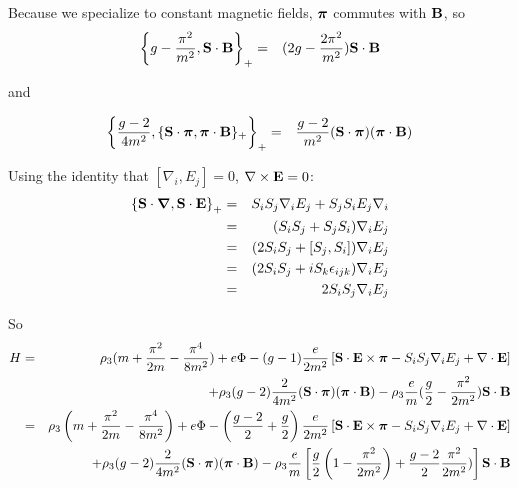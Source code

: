 Because we specialize to constant magnetic fields, $\mbox{\boldmath$ \pi $}$ commutes with $\mathbf{B}$, so 
\begin{eqnarray*}
\left \{ g -\frac{\pi^2}{m^2} , \mathbf{S} \cdot \mathbf{B} \right \}_+
	&=&	(2g - \frac{2\pi^2}{m^2}) \mathbf{S} \cdot \mathbf{B}
\end{eqnarray*}

and

\begin{eqnarray*}
\left \{ \frac{g-2}{4m^2}, 
			\{\mathbf{S} \cdot \mbox{\boldmath$ \pi $}, \mbox{\boldmath$ \pi $} \cdot \mathbf{B} \}_+ \right \}_+
	&=&		\frac{g-2}{m^2} (\mathbf{S} \cdot \mbox{\boldmath$ \pi $}) (\mbox{\boldmath$ \pi $} \cdot \mathbf{B})
\end{eqnarray*} 

Using the identity that $[\nabla_i, E_j]=0$, $\mathbf{\nabla} \times \mathbf{E} = 0$:
 \begin{eqnarray*}
 \left \{ \mathbf{S} \cdot \mbox{\boldmath$ \nabla $}, \mathbf{S} \cdot \mathbf{E} \right \}_+
	&=& S_i S_j \nabla_i E_j + S_j S_i E_j \nabla_i	\\
	&=& (S_i S_j + S_j S_i) \nabla_i E_j			\\
	&=& (2S_i S_j + [S_j, S_i])\nabla_i E_j			\\
	&=& (2S_i S_j +iS_k\epsilon_{ijk})\nabla_i E_j	\\
	&=& 2S_i S_j\nabla_i E_j
 \end{eqnarray*}
 
So
\begin{eqnarray*}
H 	&=& \rho_3 (m + \frac{\pi^2}{2m} - \frac{\pi^4}{8m^2})  + e\Phi - (g-1)\frac{e}{2m^2} 
		\left [ 
			 \mathbf{S} \cdot \mathbf{E} \times \mbox{\boldmath$ \pi $}
			-S_i S_j \nabla_i E_j 
			+\mathbf{\nabla} \cdot \mathbf{E}	
		\right ]
	\\&&
		+ \rho_3 (g-2)\frac{2}{4m^2} (\mathbf{S} \cdot \mbox{\boldmath$ \pi $}) (\mbox{\boldmath$ \pi $} \cdot \mathbf{B})
		- \rho_3 \frac{e}{m}(\frac{g}{2} - \frac{\pi^2}{2m^2}) \mathbf{S} \cdot \mathbf{B}	\\
	&=& \rho_3 \left(m + \frac{\pi^2}{2m} - \frac{\pi^4}{8m^2} \right)  + e\Phi - \left(\frac{g-2}{2} + \frac{g}{2}\right)\frac{e}{2m^2} 
		\left [ 
			 \mathbf{S} \cdot \mathbf{E} \times \mbox{\boldmath$ \pi $}
			-S_i S_j \nabla_i E_j 
			+\mathbf{\nabla} \cdot \mathbf{E}	
		\right ]	
	\\&&
		+ \rho_3 (g-2)\frac{2}{4m^2} (\mathbf{S} \cdot \mbox{\boldmath$ \pi $}) (\mbox{\boldmath$ \pi $} \cdot \mathbf{B})
		- \rho_3 \frac{e}{m}\left [\frac{g}{2}\left(1 - \frac{\pi^2}{2m^2}\right) + \frac{g-2}{2}\frac{\pi^2}{2m^2}) \right] \mathbf{S} \cdot \mathbf{B}							
\end{eqnarray*}


